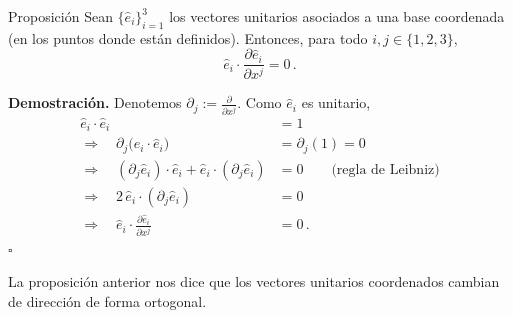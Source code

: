 \documentclass[../apunte_mecanica_clasica.tex]{subfiles}%
\begin{document}
\begin{apuntebloque}{Proposición}
Sean $\{\hat{e}_i\}_{i=1}^3$ los vectores unitarios asociados a una base coordenada
(en los puntos donde están definidos). Entonces, para todo $i,j\in\{1,2,3\}$,
\begin{equation*}
    \hat{e}_i \cdot \frac{\partial \hat{e}_i}{\partial x^j}=0\,.
\end{equation*}

\textbf{Demostración.} Denotemos $\partial_j:=\frac{\partial}{\partial x^j}$. Como $\hat{e}_i$ es unitario,
\begin{align*}
\hat{e}_i\cdot \hat{e}_i &= 1
\\[2pt]\Rightarrow\quad
\partial_j\!\big(\hat{e}_i\cdot \hat{e}_i\big) &= \partial_j(1)=0
\\[2pt]\Rightarrow\quad
(\partial_j \hat{e}_i)\cdot \hat{e}_i + \hat{e}_i\cdot(\partial_j \hat{e}_i) &= 0
\qquad\text{(regla de Leibniz)}
\\[2pt]\Rightarrow\quad
2\,\hat{e}_i\cdot(\partial_j \hat{e}_i) &= 0
\\[2pt]\Rightarrow\quad
\hat{e}_i\cdot \frac{\partial \hat{e}_i}{\partial x^j} &= 0\,.
\end{align*}
\hfill $\square$
\end{apuntebloque}
La proposición anterior nos dice que los vectores unitarios coordenados cambian de dirección de forma ortogonal.
\end{document}
